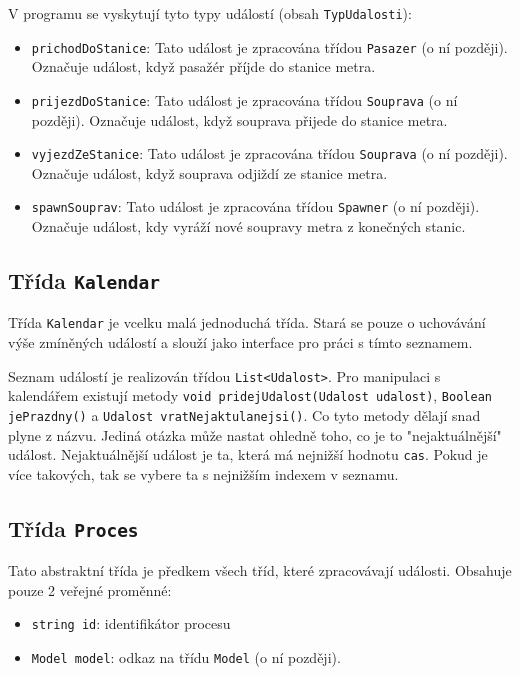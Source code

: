 \documentclass[12pt, a4paper]{article}
\begin{document}
V programu se vyskytují tyto typy událostí (obsah \texttt{TypUdalosti}):
\begin{itemize}
    \item \texttt{prichodDoStanice}: Tato událost je zpracována třídou \texttt{Pasazer} (o ní později). Označuje událost, když pasažér příjde do stanice metra.
    \item \texttt{prijezdDoStanice}: Tato událost je zpracována třídou \texttt{Souprava} (o ní později). Označuje událost, když souprava přijede do stanice metra.
    \item \texttt{vyjezdZeStanice}: Tato událost je zpracována třídou \texttt{Souprava} (o ní později). Označuje událost, když souprava odjiždí ze stanice metra.
    \item \texttt{spawnSouprav}: Tato událost je zpracována třídou \texttt{Spawner} (o ní později). Označuje událost, kdy vyráží nové soupravy metra z konečných stanic.
\end{itemize}

\subsection{Třída \texttt{Kalendar}}
Třída \texttt{Kalendar} je vcelku malá jednoduchá třída. Stará se pouze o uchovávání výše zmíněných událostí a slouží jako interface pro práci s tímto seznamem.

Seznam událostí je realizován třídou \texttt{List<Udalost>}. Pro manipulaci s kalendářem existují metody \texttt{void pridejUdalost(Udalost udalost)}, \texttt{Boolean jePrazdny()} a \texttt{Udalost vratNejaktulanejsi()}. Co tyto metody dělají snad plyne z názvu. Jediná otázka může nastat ohledně toho, co je to "nejaktuálnější" událost. Nejaktuálnější událost je ta, která má nejnižší hodnotu \texttt{cas}. Pokud je více takových, tak se vybere ta s nejnižším indexem v seznamu.

\subsection{Třída \texttt{Proces}}
Tato abstraktní třída je předkem všech tříd, které zpracovávají události. Obsahuje pouze 2 veřejné proměnné:
\begin{itemize}
    \item \texttt{string id}: identifikátor procesu
    \item \texttt{Model model}: odkaz na třídu \texttt{Model} (o ní později).
\end{itemize}
\end{document}
